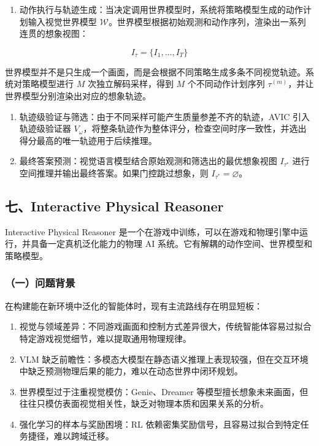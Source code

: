 \begin{enumerate}
\def\labelenumi{\arabic{enumi}.}
\setcounter{enumi}{1}
\tightlist
\item
  动作执行与轨迹生成：当决定调用世界模型时，系统将策略模型生成的动作计划输入视觉世界模型 \(\mathcal{W}\)。世界模型根据初始观测和动作序列，渲染出一系列连贯的想象视图：
\end{enumerate}

\[
I_\tau = \{I_1, \ldots, I_T\}
\]

世界模型并不是只生成一个画面，而是会根据不同策略生成多条不同视觉轨迹。系统对策略模型进行 \(M\) 次独立解码采样，得到 \(M\) 个不同动作计划序列 \(\tau^{(m)}\)，并让世界模型分别渲染出对应的想象轨迹。

\begin{enumerate}
\def\labelenumi{\arabic{enumi}.}
\setcounter{enumi}{2}
\tightlist
\item
  轨迹级验证与筛选：由于不同采样可能产生质量参差不齐的轨迹，AVIC 引入轨迹级验证器 \(V_\omega\)，将整条轨迹作为整体评分，检查空间时序一致性，并选出得分最高的唯一轨迹用于后续推理。
\item
  最终答案预测：视觉语言模型结合原始观测和筛选出的最优想象视图 \(I_{\tau^*}\) 进行空间推理并输出最终答案。如果门控跳过想象，则 \(I_{\tau^*} = \varnothing\)。
\end{enumerate}

\hypertarget{ux4e03interactive-physical-reasoner}{%
\subsection{七、Interactive Physical Reasoner}\label{ux4e03interactive-physical-reasoner}}

Interactive Physical Reasoner 是一个在游戏中训练，可以在游戏和物理引擎中运行，并具备一定真机泛化能力的物理 AI 系统。它有解耦的动作空间、世界模型和策略模型。

\hypertarget{ux4e00ux95eeux9898ux80ccux666f-19}{%
\subsubsection{（一）问题背景}\label{ux4e00ux95eeux9898ux80ccux666f-19}}

在构建能在新环境中泛化的智能体时，现有主流路线存在明显短板：

\begin{enumerate}
\def\labelenumi{\arabic{enumi}.}
\tightlist
\item
  视觉与领域差异：不同游戏画面和控制方式差异很大，传统智能体容易过拟合特定游戏视觉细节，难以提取通用物理规律。
\item
  VLM 缺乏前瞻性：多模态大模型在静态语义推理上表现较强，但在交互环境中缺乏预测物理后果的能力，难以在动态世界中闭环规划。
\item
  世界模型过于注重视觉模仿：Genie、Dreamer 等模型擅长想象未来画面，但往往只模仿表面视觉相关性，缺乏对物理本质和因果关系的分析。
\item
  强化学习的样本与奖励困境：RL 依赖密集奖励信号，且容易过拟合到特定任务捷径，难以跨域迁移。
\end{enumerate}

